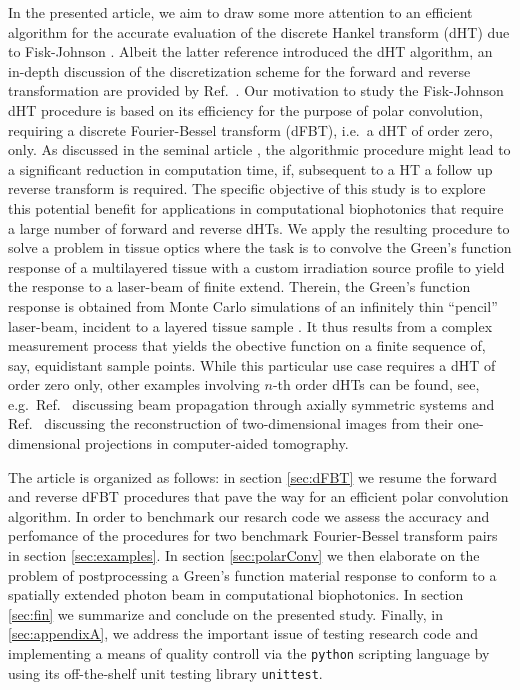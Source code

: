 \documentclass[12pt]{iopart}
\begin{document}
In the presented article, we aim to draw some more attention to an efficient 
algorithm for the accurate evaluation of the discrete Hankel transform (dHT) 
due to Fisk-Johnson \cite{FiskJohnson:1987}. Albeit the latter reference
introduced the dHT algorithm, an in-depth discussion of the discretization 
scheme for the forward and reverse transformation are provided by 
Ref.~\cite{Baddour:2015}.
Our motivation to study the Fisk-Johnson dHT procedure is based on its
efficiency for the purpose of polar convolution, requiring a discrete
Fourier-Bessel transform (dFBT), i.e.\ a dHT of order zero, only. As discussed
in the seminal article \cite{FiskJohnson:1987}, the algorithmic procedure might
lead to a significant reduction in computation time, if, subsequent to a HT a 
follow up reverse transform is required.  
The specific objective of this study is to explore this potential benefit for
applications in computational biophotonics that require a large number of
forward and reverse dHTs.  
We apply the resulting procedure to solve a problem in tissue
optics where the task is to convolve the Green's function response of a
multilayered tissue with a custom irradiation source profile to yield
the response to a laser-beam of finite extend.
Therein, the Green's function response is obtained from Monte Carlo simulations
of an infinitely thin ``pencil'' laser-beam, incident to a layered tissue sample 
\cite{MCML:1995}. It thus 
results from a complex measurement process that yields the obective 
function on a finite sequence of, say, equidistant sample points.
While this particular use case requires a dHT of order zero only, other
examples involving $n$-th order dHTs can be found, see, e.g.\ Ref.\
\cite{GuizarSicairos:2004} discussing beam propagation through axially
symmetric systems and Ref.\ \cite{Higgins:1988} discussing the reconstruction 
of two-dimensional images from their one-dimensional projections in 
computer-aided tomography.


The article is organized as follows: in section \ref{sec:dFBT} we
resume the forward and reverse dFBT procedures that pave the way for an
efficient polar convolution algorithm. In order to benchmark our resarch code
we assess the accuracy and perfomance of the procedures for two benchmark
Fourier-Bessel transform pairs in section \ref{sec:examples}. In section
\ref{sec:polarConv} we then elaborate on the problem of postprocessing a
Green's function material response to conform to a spatially extended photon
beam in computational biophotonics.  In section \ref{sec:fin} we
summarize and conclude on the presented study.
Finally, in \ref{sec:appendixA}, we address the important issue of
testing research code and implementing a means of quality controll via the
{\tt{python}} scripting language by using its off-the-shelf unit testing
library {\tt{unittest}}.
\end{document}
